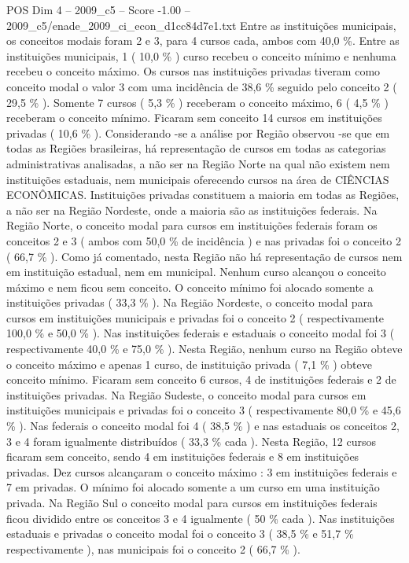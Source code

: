 \begin{textsample}{POS Dim 4 – 2009\_c5 – Score -1.00 – 2009\_c5/enade\_2009\_ci\_econ\_d1cc84d7e1.txt}
Entre as instituições municipais, os conceitos modais foram 2 e 3, para 4 cursos cada, ambos com 40,0 \%.
Entre as instituições municipais, 1 ( 10,0 \% ) curso recebeu o conceito mínimo e nenhuma recebeu o conceito máximo.
Os cursos nas instituições privadas tiveram como conceito modal o valor 3 com uma incidência de 38,6 \% seguido pelo conceito 2 ( 29,5 \% ).
Somente 7 cursos ( 5,3 \% ) receberam o conceito máximo, 6 ( 4,5 \% ) receberam o conceito mínimo.
Ficaram sem conceito 14 cursos em instituições privadas ( 10,6 \% ).
Considerando -se a análise por Região observou -se que em todas as Regiões brasileiras, há representação de cursos em todas as categorias administrativas analisadas, a não ser na Região Norte na qual não existem nem instituições estaduais, nem municipais oferecendo cursos na área de CIÊNCIAS ECONÔMICAS.
Instituições privadas constituem a maioria em todas as Regiões, a não ser na Região Nordeste, onde a maioria são as instituições federais.
Na Região Norte, o conceito modal para cursos em instituições federais foram os conceitos 2 e 3 ( ambos com 50,0 \% de incidência ) e nas privadas foi o conceito 2 ( 66,7 \% ).
Como já comentado, nesta Região não há representação de cursos nem em instituição estadual, nem em municipal.
Nenhum curso alcançou o conceito máximo e nem ficou sem conceito.
O conceito mínimo foi alocado somente a instituições privadas ( 33,3 \% ).
Na Região Nordeste, o conceito modal para cursos em instituições municipais e privadas foi o conceito 2 ( respectivamente 100,0 \% e 50,0 \% ).
Nas instituições federais e estaduais o conceito modal foi 3 ( respectivamente 40,0 \% e 75,0 \% ).
Nesta Região, nenhum curso na Região obteve o conceito máximo e apenas 1 curso, de instituição privada ( 7,1 \% ) obteve conceito mínimo.
Ficaram sem conceito 6 cursos, 4 de instituições federais e 2 de instituições privadas.
Na Região Sudeste, o conceito modal para cursos em instituições municipais e privadas foi o conceito 3 ( respectivamente 80,0 \% e 45,6 \% ).
Nas federais o conceito modal foi 4 ( 38,5 \% ) e nas estaduais os conceitos 2, 3 e 4 foram igualmente distribuídos ( 33,3 \% cada ).
Nesta Região, 12 cursos ficaram sem conceito, sendo 4 em instituições federais e 8 em instituições privadas.
Dez cursos alcançaram o conceito máximo : 3 em instituições federais e 7 em privadas.
O mínimo foi alocado somente a um curso em uma instituição privada.
Na Região Sul o conceito modal para cursos em instituições federais ficou dividido entre os conceitos 3 e 4 igualmente ( 50 \% cada ).
Nas instituições estaduais e privadas o conceito modal foi o conceito 3 ( 38,5 \% e 51,7 \% respectivamente ), nas municipais foi o conceito 2 ( 66,7 \% ).

\end{textsample}
